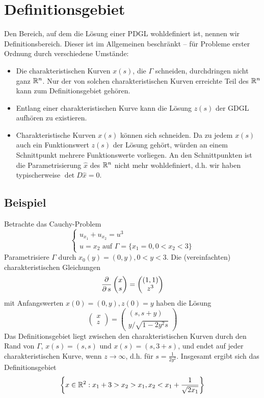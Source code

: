 \section{Definitionsgebiet}
\label{sec:para4}
Den Bereich, auf dem die Lösung einer PDGL wohldefiniert ist, nennen wir Definitionsbereich. Dieser ist im Allgemeinen beschränkt -- für Probleme erster Ordnung durch verschiedene Umstände:
	\begin{itemize}
		\item Die charakteristischen Kurven $x(s)$, die $\Gamma$ schneiden, durchdringen nicht ganz $\mathbb{R}^n$. Nur der von solchen charakteristischen Kurven erreichte Teil des $\mathbb{R}^n$ kann zum Definitionsgebiet gehören.
		\item Entlang einer charakteristischen Kurve kann die Lösung $z(s)$ der GDGL aufhören zu existieren.
		\item Charakteristische Kurven $x(s)$ können sich schneiden. Da zu jedem $x(s)$ auch ein Funktionswert $z(s)$ der Lösung gehört,	würden an einem Schnittpunkt mehrere Funktionswerte vorliegen. An den Schnittpunkten ist die Parametrisierung $\widehat{x}$ des $\mathbb{R}^n$ nicht mehr wohldefiniert, d.h. wir haben typischerweise $\det D\widehat{x} = 0$.
	\end{itemize}

\subsection{Beispiel}
\label{bsp_11}
	Betrachte das Cauchy-Problem \marginnote{[11]}
	\[ \begin{cases}
		u_{x_1} + u_{x_2} = u^3 \\
		u = x_2	\text{ auf } \Gamma = \{x_1 = 0, 0 < x_2 < 3\}
		\end{cases} \]
	Parametrisiere $\Gamma$ durch $x_0(y) = (0,y), 0 < y < 3$. Die (vereinfachten) charakteristischen Gleichungen
	\[ \frac{\operatorname{\partial}}{\operatorname{\partial} s} \begin{pmatrix} x \\ s \end{pmatrix} = \begin{pmatrix} (1,1) \\ z^3 \end{pmatrix} \]
	mit Anfangswerten $x(0) = (0,y), z(0) = y$ haben die Lösung
	\[ \begin{pmatrix} x \\ z \end{pmatrix} = \begin{pmatrix} (s,s+y) \\ y/\sqrt{1-2y^2s} \end{pmatrix} \]
	Das Definitionsgebiet liegt zwischen den charakteristischen Kurven durch den Rand von $\Gamma$, $x(s) = (s,s)$ und $x(s) = (s,3+s)$, und endet auf jeder charakteristischen Kurve, wenn $z \rightarrow \infty$, d.h. für $s = \frac{1}{2y^2}$. Insgesamt ergibt sich das Definitionsgebiet
	\[ \left\{ x \in \mathbb{R}^2 : x_1 + 3 > x_2 > x_1, x_2 < x_1 + \frac{1}{\sqrt{2x_1}} \right\} \]

